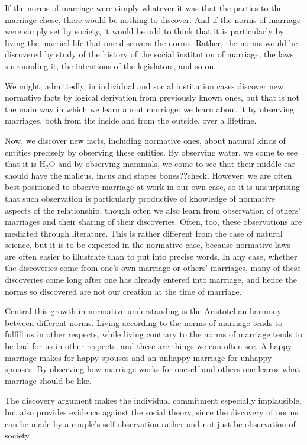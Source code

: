 If the norms of marriage were simply whatever it was that the parties to the marriage chose, there would be nothing to discover.
And if the norms of marriage were simply set by society, it would be odd to think that it is particularly by living the married life that
one discovers the norms. Rather, the norms would be discovered by study of the history of the social institution of marriage,
the laws surrounding it, the intentions of the legislators, and so on.

We might, admittedly, in individual and social institution cases discover
new normative facts by logical derivation from previously known ones, but that is not the main way in which we learn about marriage:
we learn about it by observing marriages, both from the inside and from the outside, over a lifetime.

Now, we discover new facts, including normative ones, about natural kinds of entities precisely by observing these entities. By observing water,
we come to see that it is H$_2$O and by observing mammals, we come to see that their middle ear should have the malleus, incus and stapes bones??check. However, we are often best positioned to observe marriage at work in our own case, so it 
is unsurprising that such observation is particularly productive of knowledge of normative aspects of the relationship,
though often we also learn from observation of others' marriages and their sharing of their discoveries. Often, too,
these observations are mediated through literature. This is rather different from the case of natural science, but it is
to be expected in the normative case, because normative laws are often easier to illustrate than to put into precise
words. In any case, whether the discoveries come from one's own marriage or others' marriages, many of these discoveries
come long after one has already entered into marriage, and hence the norms so discovered are not our creation at
the time of marriage.

Central this growth in normative understanding is the Aristotelian harmony between different norms. Living according to the norms of marriage tends to fulfill us in other respects,
while living contrary to the norms of marriage tends to be bad for us in other respects, and these are things we can often see. A happy marriage makes for
happy spouses and an unhappy marriage for unhappy spouses. By observing how marriage works for oneself and others
one learns what marriage should be like.

The discovery argument makes the individual commitment especially implausible, but also provides evidence against
the social theory, since the discovery of norms can be made by a couple's self-observation rather and not just be
observation of society.

